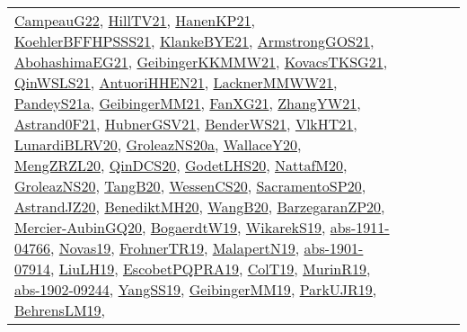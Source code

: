 {\begin{longtable}{lp{3cm}>{\raggedright}p{6cm}>{\raggedright}p{6cm}p{8cm}}
\href{articles/CampeauG22.pdf}{CampeauG22}\cite{CampeauG22}, \href{papers/HillTV21.pdf}{HillTV21}\cite{HillTV21}, \href{papers/HanenKP21.pdf}{HanenKP21}\cite{HanenKP21}, \href{articles/KoehlerBFFHPSSS21.pdf}{KoehlerBFFHPSSS21}\cite{KoehlerBFFHPSSS21}, \href{papers/KlankeBYE21.pdf}{KlankeBYE21}\cite{KlankeBYE21}, \href{papers/ArmstrongGOS21.pdf}{ArmstrongGOS21}\cite{ArmstrongGOS21}, \href{articles/AbohashimaEG21.pdf}{AbohashimaEG21}\cite{AbohashimaEG21}, \href{papers/GeibingerKKMMW21.pdf}{GeibingerKKMMW21}\cite{GeibingerKKMMW21}, \href{papers/KovacsTKSG21.pdf}{KovacsTKSG21}\cite{KovacsTKSG21}, \href{articles/QinWSLS21.pdf}{QinWSLS21}\cite{QinWSLS21}, \href{papers/AntuoriHHEN21.pdf}{AntuoriHHEN21}\cite{AntuoriHHEN21}, \href{papers/LacknerMMWW21.pdf}{LacknerMMWW21}\cite{LacknerMMWW21}, \href{articles/PandeyS21a.pdf}{PandeyS21a}\cite{PandeyS21a}, \href{papers/GeibingerMM21.pdf}{GeibingerMM21}\cite{GeibingerMM21}, \href{articles/FanXG21.pdf}{FanXG21}\cite{FanXG21}, \href{articles/ZhangYW21.pdf}{ZhangYW21}\cite{ZhangYW21}, \href{papers/Astrand0F21.pdf}{Astrand0F21}\cite{Astrand0F21}, \href{articles/HubnerGSV21.pdf}{HubnerGSV21}\cite{HubnerGSV21}, \href{papers/BenderWS21.pdf}{BenderWS21}\cite{BenderWS21}, \href{articles/VlkHT21.pdf}{VlkHT21}\cite{VlkHT21}, \href{articles/LunardiBLRV20.pdf}{LunardiBLRV20}\cite{LunardiBLRV20}, \href{papers/GroleazNS20a.pdf}{GroleazNS20a}\cite{GroleazNS20a}, \href{articles/WallaceY20.pdf}{WallaceY20}\cite{WallaceY20}, \href{articles/MengZRZL20.pdf}{MengZRZL20}\cite{MengZRZL20}, \href{articles/QinDCS20.pdf}{QinDCS20}\cite{QinDCS20}, \href{papers/GodetLHS20.pdf}{GodetLHS20}\cite{GodetLHS20}, \href{papers/NattafM20.pdf}{NattafM20}\cite{NattafM20}, \href{papers/GroleazNS20.pdf}{GroleazNS20}\cite{GroleazNS20}, \href{papers/TangB20.pdf}{TangB20}\cite{TangB20}, \href{papers/WessenCS20.pdf}{WessenCS20}\cite{WessenCS20}, \href{articles/SacramentoSP20.pdf}{SacramentoSP20}\cite{SacramentoSP20}, \href{articles/AstrandJZ20.pdf}{AstrandJZ20}\cite{AstrandJZ20}, \href{articles/BenediktMH20.pdf}{BenediktMH20}\cite{BenediktMH20}, \href{papers/WangB20.pdf}{WangB20}\cite{WangB20}, \href{papers/BarzegaranZP20.pdf}{BarzegaranZP20}\cite{BarzegaranZP20}, \href{papers/Mercier-AubinGQ20.pdf}{Mercier-AubinGQ20}\cite{Mercier-AubinGQ20}, \href{papers/BogaerdtW19.pdf}{BogaerdtW19}\cite{BogaerdtW19}, \href{articles/WikarekS19.pdf}{WikarekS19}\cite{WikarekS19}, \href{articles/abs-1911-04766.pdf}{abs-1911-04766}\cite{abs-1911-04766}, \href{articles/Novas19.pdf}{Novas19}\cite{Novas19}, \href{papers/FrohnerTR19.pdf}{FrohnerTR19}\cite{FrohnerTR19}, \href{papers/MalapertN19.pdf}{MalapertN19}\cite{MalapertN19}, \href{articles/abs-1901-07914.pdf}{abs-1901-07914}\cite{abs-1901-07914}, \href{papers/LiuLH19.pdf}{LiuLH19}\cite{LiuLH19}, \href{articles/EscobetPQPRA19.pdf}{EscobetPQPRA19}\cite{EscobetPQPRA19}, \href{papers/ColT19.pdf}{ColT19}\cite{ColT19}, \href{papers/MurinR19.pdf}{MurinR19}\cite{MurinR19}, \href{articles/abs-1902-09244.pdf}{abs-1902-09244}\cite{abs-1902-09244}, \href{papers/YangSS19.pdf}{YangSS19}\cite{YangSS19}, \href{papers/GeibingerMM19.pdf}{GeibingerMM19}\cite{GeibingerMM19}, \href{papers/ParkUJR19.pdf}{ParkUJR19}\cite{ParkUJR19}, \href{papers/BehrensLM19.pdf}{BehrensLM19}\cite{BehrensLM19}, 
\end{longtable}}

